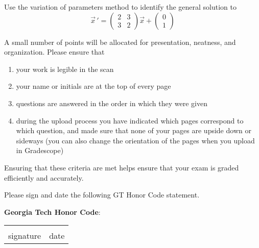 \documentclass[12pt]{exam}
\begin{document}
\begin{questions}
    \newpage \InitialsRight
    \question[10] Use the variation of parameters method to identify the general solution to \[\vec{x} \, ' = \left( \begin{array}{rr} 2 & 3 \\ 3 & 2 \end{array} \right) \vec{x}  + \left( \begin{array}{r}  0\\ 1\end{array} \right)  \]

    
    \newpage 

    \question[2] A small number of points will be allocated for presentation, neatness, and organization. Please ensure that
    \begin{enumerate}
        \item your work is legible in the scan
        \item your name or initials are at the top of every page
        \item questions are answered in the order in which they were given
        \item during the upload process you have indicated which pages correspond to which question, and made sure that none of your pages are upside down or sideways (you can also change the orientation of the pages when you upload in Gradescope)
    \end{enumerate}
    Ensuring that these criteria are met helps ensure that your exam is graded efficiently and accurately. 
    


    
\end{questions}
    
    Please sign and date the following GT Honor Code statement. \\ 
    \vspace{2pt}
    
    \textbf{Georgia Tech Honor Code}:\ \GTHonorCode
    
    \begin{center}
    \begin{center}
        \def\arraystretch{0.35}%
        \begin{tabular}{ b{8cm} b{8cm} }
        \vspace{.5cm} \underline{\hspace{7cm}} & \vspace{.5cm} \underline{\hspace{4.5cm}}  \tabularnewline
        \vspace{6pt} signature & \vspace{6pt} date    
        \end{tabular}
    \end{center}
    \end{center}    
\end{document}
